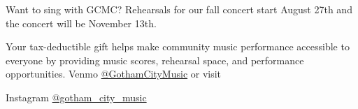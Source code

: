 \documentclass{article}[10pt]
\begin{document}
\begin{center}
\begin{minipage}{95mm}
\begin{center}
                \vspace{1mm}

                \begin{small}
                    Want to sing with GCMC? Rehearsals for our fall concert start August 27th and the concert will be November 13th.
                \end{small}


            \end{center}


            \begin{center}
                {\textbf{}}
            \end{center}
            \vspace{-3mm}
            \begin{footnotesize}
                Your tax-deductible gift helps make community music performance accessible to everyone by providing music scores, rehearsal space, and performance opportunities.
                Venmo \href{https://account.venmo.com/u/GothamCityMusic}{@GothamCityMusic} or visit \textbf{}
            \end{footnotesize}


            \begin{center}
                {\textbf{}}

                \faInstagram{}{}  Instagram  \href{https://www.instagram.com/gotham_city_music/}{@gotham\_city\_music}
            \end{center}


        \end{minipage}

    \end{center}
\end{document}
